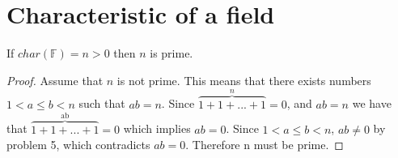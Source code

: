 \section{Characteristic of a field}
If $char(\mathbb{F}) = n > 0$ then $n$ is prime.
\begin{proof} 
    Assume that $n$ is not prime. 
    This means that there exists numbers $1 < a \leq b < n$ such that $ab = n$.
    Since $\overbrace{1+1+...+1}^n = 0$, and
    $ab = n$
    we have that
    $\overbrace{1+1+...+1}^\text{ab} = 0$ which implies
    $ab = 0$.
    Since $1 < a \leq b < n$, $ab \neq 0$ by problem 5, 
    which contradicts $ab = 0$.
    Therefore n must be prime.
\end{proof}
